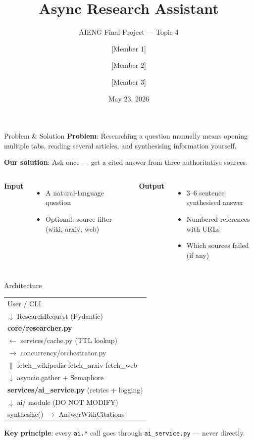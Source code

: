 \documentclass[aspectratio=169]{beamer}
\title[Async Research Assistant]{Async Research Assistant}
\subtitle{AIENG Final Project — Topic 4}
\author{[Member 1] \and [Member 2] \and [Member 3]}
\institute{AI Engineering 110 · Spring 2026}
\date{May 23, 2026}
\begin{document}
\begin{frame}
\titlepage
\end{frame}

\begin{frame}{Problem \& Solution}
\textbf{Problem}: Researching a question manually means opening multiple tabs,
reading several articles, and synthesising information yourself.

\vspace{1em}
\textbf{Our solution}: Ask once — get a cited answer from three authoritative sources.

\vspace{1em}
\begin{columns}
  \textbf{Input}
  \begin{itemize}
    \item A natural-language question
    \item Optional: source filter (wiki, arxiv, web)
  \end{itemize}

  \textbf{Output}
  \begin{itemize}
    \item 3–6 sentence synthesised answer
    \item Numbered references with URLs
    \item Which sources failed (if any)
  \end{itemize}
\end{columns}
\end{frame}

\begin{frame}{Architecture}
\begin{center}
\ttfamily\small
\begin{tabular}{l}
User / CLI\\
\quad $\downarrow$ ResearchRequest (Pydantic)\\
\textbf{core/researcher.py}\\
\quad $\leftarrow$ services/cache.py (TTL lookup)\\
\quad $\rightarrow$ concurrency/orchestrator.py\\
\qquad $\parallel$ fetch\_wikipedia \quad fetch\_arxiv \quad fetch\_web\\
\qquad $\downarrow$ asyncio.gather + Semaphore\\
\textbf{services/ai\_service.py} (retries + logging)\\
\quad $\downarrow$ ai/ module (DO NOT MODIFY)\\
\quad \quad synthesize() $\rightarrow$ AnswerWithCitations\\
\end{tabular}
\end{center}

\vspace{0.5em}
\textbf{Key principle}: every \texttt{ai.*} call goes through \texttt{ai\_service.py} — never directly.
\end{frame}
\end{document}
